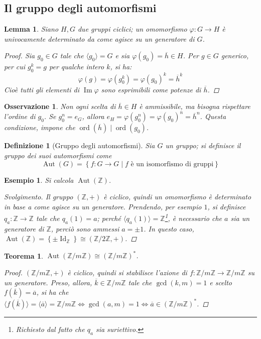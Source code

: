 \documentclass[11pt]{scrartcl}
\theoremstyle{style1}
\newtheorem{osservazione}{Osservazione}[section]
\newtheorem{teorema}{Teorema}[section]
\newtheorem{lemma}{Lemma}[teorema]
\newtheorem{definizione}{Definizione}[section]
\newtheorem{esempio}{Esempio}[section]
\newenvironment{svolgimento}{\renewcommand\qedsymbol{$\blacksquare$}\begin{proof}[Svolgimento]}{\end{proof}}
\numberwithin{equation}{subsection}
\begin{document}
\subsection{Il gruppo degli automorfismi}
\begin{lemma}
	Siano $H,G$ due gruppi ciclici; un omomorfismo $\varphi : G \to H$ \`e univocamente determinato da come agisce su un generatore di $G$.
	\begin{proof}
		Sia $g_0\in G$ tale che $\langle g_0 \rangle = G$ e sia $\varphi (g_0) = \overline{h}\in H$.
		Per $g \in G$ generico, per cui $g_0^k = g$ per qualche intero $k$, si ha:
		\[
		\varphi (g) = \varphi (g_0^k) = \varphi (g_0)^k = \overline{h}^k
		\] 
		Cio\`e tutti gli elementi di $\operatorname{Im} \varphi $ sono esprimibili come potenze di $\overline{h}$.
	\end{proof}
\end{lemma}
\begin{osservazione}
Non ogni scelta di $\overline{h} \in H$ \`e ammissibile, ma bisogna rispettare l'ordine di $g_0$.
Se $g_0^n = e_G$, allora $e_H = \varphi (g_0^n) = \varphi (g_0)^n = \overline{h}^n$. Questa condizione, impone che $\operatorname{ord}(\overline{h})  \mid \operatorname{ord}(g_0) $.
\end{osservazione}
\begin{definizione}
	[Gruppo degli automorfismi]
	Sia $G$ un gruppo; si definisce il gruppo dei suoi automorfismi come
	\[
	\operatorname{Aut} (G) = \left\{ f: G \to G  \mid f \text{ \`e un isomorfismo di gruppi} \right\} 
	\] 
\end{definizione}
\begin{esempio}
	Si calcola $\operatorname{Aut} (\mathbb{Z})$. 
	\begin{svolgimento}
		Il gruppo $(\mathbb{Z},+)$ \`e ciclico, quindi un omomorfismo \`e determinato in base a come agisce su un generatore.
		Prendendo, per esempio $1$, si definisce $q_a :\mathbb{Z}\to \mathbb{Z} $ tale che $ q_a (1 ) = a$; perch\'e $\langle q_a(1) \rangle = \mathbb{Z}$\footnote{Richiesto dal fatto che $q_a$ sia suriettivo.}, \`e necessario che $a$ sia un generatore di $\mathbb{Z}$, perci\`o sono ammessi $a = \pm 1$. 
		In questo caso, $\operatorname{Aut} (\mathbb{Z})=\left\{ \pm \operatorname{Id} _{\mathbb{Z}}  \right\} \cong \left(\mathbb{Z} / 2\mathbb{Z}, +\right) $.
	\end{svolgimento}
\end{esempio}
\begin{teorema}
$\operatorname{Aut} (\mathbb{Z} / m \mathbb{Z}) \cong (\mathbb{Z} / m \mathbb{Z})^*$.
\begin{proof}
	$(\mathbb{Z} / m\mathbb{Z}, + )$ \`e ciclico, quindi si stabilisce l'azione di $f:\mathbb{Z} / m\mathbb{Z}\to \mathbb{Z}/ m\mathbb{Z}$ su un generatore.
	Preso, allora, $\overline{k} \in \mathbb{Z} / m\mathbb{Z} $ tale che $\operatorname{gcd}(k,m) =1$ e scelto $f(\overline{k}) = \overline{a}$, si ha che $\langle f(\overline{k}) \rangle= \langle \overline{a} \rangle= \mathbb{Z} / m\mathbb{Z} \iff \operatorname{gcd}(a,m) =1	\iff \overline{a} \in \left(\mathbb{Z} / m\mathbb{Z}\right) ^* $.
\end{proof}
\end{teorema}
\end{document}
